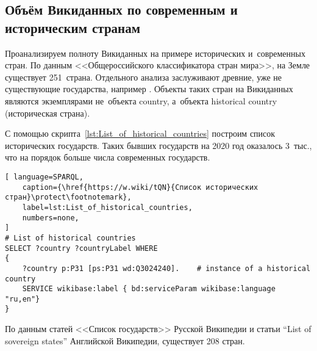 \subsection{Объём Викиданных по современным и историческим странам}

Проанализируем полноту Викиданных на примере исторических и~современных стран. 
По данным <<Общероссийского классификатора стран мира>>\autocite{oksm},
на Земле существует 251~страна. 
Отдельного анализа заслуживают древние, уже не существующие государства, 
например . 
Объекты таких стран на Викиданных являются экземплярами не~объекта country, 
а~объекта historical country (историческая страна). 

С помощью скрипта~\ref{lst:List_of_historical_countries} построим список исторических государств. 
Таких бывших государств на 2020 год оказалось 3~тыс., что на порядок больше числа современных государств.
%


\begin{lstlisting}[ language=SPARQL, 
    caption={\href{https://w.wiki/tQN}{Список исторических стран}\protect\footnotemark},
    label=lst:List_of_historical_countries, 
    numbers=none,
]
# List of historical countries
SELECT ?country ?countryLabel WHERE
{
    ?country p:P31 [ps:P31 wd:Q3024240].    # instance of a historical country 
    SERVICE wikibase:label { bd:serviceParam wikibase:language "ru,en"} 
}
\end{lstlisting}


По данным статей <<Список государств>>\autocite{list_of_sovereign_states} Русской Википедии 
и статьи ``List of sovereign states''\autocite{list_of_sovereign_states_en} Английской Википедии, 
существует 208 стран.


